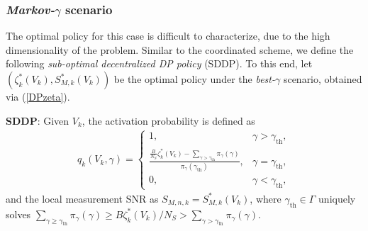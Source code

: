 \documentclass[10pt,twocolumn,twoside]{IEEEtran}
\theoremstyle{plain}
\begin{document}
\subsubsection{\emph{Markov-}$\gamma$ scenario}
 \label{MarkovDIST}
The optimal policy for this case is difficult to characterize, due to the high dimensionality of the problem.
 Similar to the coordinated scheme, we define the following \emph{sub-optimal decentralized DP policy} (SDDP).
 To this end, let $(\zeta_k^*(V_k),S_{M,k}^*(V_k))$ be the optimal policy under the \emph{best-}$\gamma$ scenario, obtained via (\ref{DPzeta}).
 
\noindent\textbf{SDDP}:
Given $V_k$,
the activation probability is defined as
\begin{align}
q_k(V_k,\gamma)=
\left\{
\begin{array}{ll}
1,&\gamma >\gamma_{\mathrm{th}},\\
\frac{\frac{B}{N_S}\zeta_k^{*}(V_k)-\sum_{\gamma>\gamma_{\mathrm{th}}}\pi_{\gamma}(\gamma)}{\pi_{\gamma}(\gamma_{\mathrm{th}})},
&
\gamma=\gamma_{\mathrm{th}},\\
0,&\gamma<\gamma_{\mathrm{th}},
\end{array}
\right.
\end{align}
and the local measurement SNR as $S_{M,n,k}\!{=}S_{M,k}^*\!(V_k)$,
 where $\gamma_{\mathrm{th}}{\in}\Gamma$ uniquely solves
$\!\!\!\underset{\gamma\geq \gamma_{\mathrm{th}}}{\sum}\!\!\!\!\pi_{\gamma}(\gamma){\geq}
B\zeta_k^{*}(V_k)/N_S{>}\!\!\!\!\underset{\gamma{>}\gamma_{\mathrm{th}}}\sum\!\!\!\pi_{\gamma}(\gamma)$.\hfill\QED
\end{document}

